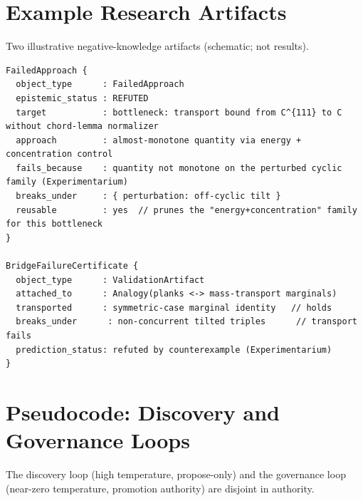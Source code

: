 \documentclass[11pt]{article}
\theoremstyle{definition}
\theoremstyle{remark}
\begin{document}
\section{Example Research Artifacts}
\label{app:artifacts}

Two illustrative negative-knowledge artifacts (schematic; not results).

{\footnotesize\begin{verbatim}
FailedApproach {
  object_type      : FailedApproach
  epistemic_status : REFUTED
  target           : bottleneck: transport bound from C^{111} to C without chord-lemma normalizer
  approach         : almost-monotone quantity via energy + concentration control
  fails_because    : quantity not monotone on the perturbed cyclic family (Experimentarium)
  breaks_under     : { perturbation: off-cyclic tilt }
  reusable         : yes  // prunes the "energy+concentration" family for this bottleneck
}

BridgeFailureCertificate {
  object_type      : ValidationArtifact
  attached_to      : Analogy(planks <-> mass-transport marginals)
  transported      : symmetric-case marginal identity   // holds
  breaks_under      : non-concurrent tilted triples      // transport fails
  prediction_status: refuted by counterexample (Experimentarium)
}
\end{verbatim}}

\section{Pseudocode: Discovery and Governance Loops}
\label{app:pseudocode}

The discovery loop (high temperature, propose-only) and the governance loop (near-zero temperature,
promotion authority) are disjoint in authority.
\end{document}
